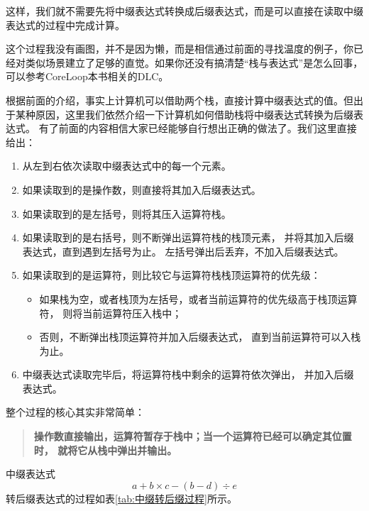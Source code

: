 这样，我们就不需要先将中缀表达式转换成后缀表达式，而是可以直接在读取中缀表达式的过程中完成计算。

这个过程我没有画图，并不是因为懒，而是相信通过前面的寻找温度的例子，你已经对类似场景建立了足够的直觉。如果你还没有搞清楚“栈与表达式”是怎么回事，
可以参考CoreLoop本书相关的DLC。


根据前面的介绍，事实上计算机可以借助两个栈，直接计算中缀表达式的值。但出于某种原因，这里我们依然介绍一下计算机如何借助栈将中缀表达式转换为后缀表达式。
有了前面的内容相信大家已经能够自行想出正确的做法了。我们这里直接给出：
\begin{enumerate}
    \item 从左到右依次读取中缀表达式中的每一个元素。
    \item 如果读取到的是操作数，则直接将其加入后缀表达式。
    \item 如果读取到的是左括号，则将其压入运算符栈。
    \item 如果读取到的是右括号，则不断弹出运算符栈的栈顶元素，
    并将其加入后缀表达式，直到遇到左括号为止。
    左括号弹出后丢弃，不加入后缀表达式。
    \item 如果读取到的是运算符，则比较它与运算符栈栈顶运算符的优先级：
    \begin{itemize}
        \item 如果栈为空，或者栈顶为左括号，或者当前运算符的优先级高于栈顶运算符，
        则将当前运算符压入栈中；
        \item 否则，不断弹出栈顶运算符并加入后缀表达式，
        直到当前运算符可以入栈为止。
    \end{itemize}
    \item 中缀表达式读取完毕后，将运算符栈中剩余的运算符依次弹出，
    并加入后缀表达式。
\end{enumerate}
整个过程的核心其实非常简单：
\begin{quote}
\textbf{操作数直接输出，运算符暂存于栈中；当一个运算符已经可以确定其位置时，
就将它从栈中弹出并输出。}
\end{quote}
中缀表达式
\[
a+b\times c-(b-d)\div e
\]
转后缀表达式的过程如表\ref{tab:中缀转后缀过程}所示。
